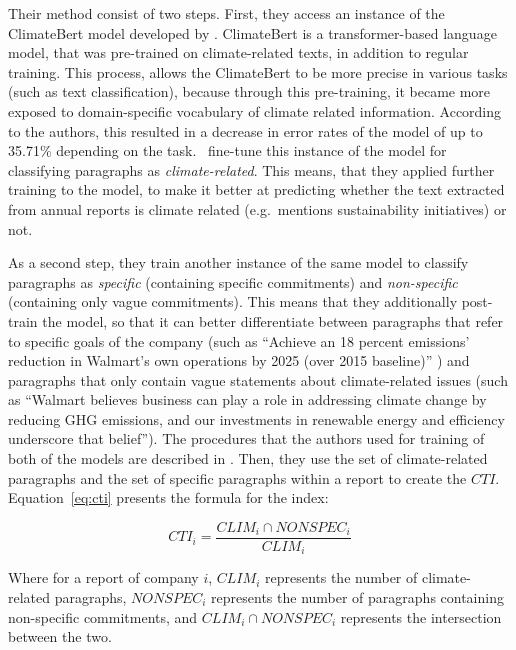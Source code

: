 \documentclass[12pt]{article}
\begin{document}
Their method consist of two steps. First, they access an instance of the ClimateBert model developed by \textcite{webersinkeCLIMATEBERTPretrainedLanguage2022}. ClimateBert is a transformer-based language model, that was pre-trained on climate-related texts, in addition to regular training. This process, allows the ClimateBert to be more precise in various tasks (such as text classification), because through this pre-training, it became more exposed to domain-specific vocabulary of climate related information. According to the authors, this resulted in a decrease in error rates of the model of up to 35.71\% depending on the task.~\citeauthor{binglerHowCheapTalk2024} fine-tune this instance of the model for classifying paragraphs as \textit{climate-related}. This means, that they applied further training to the model, to make it better at predicting whether the text extracted from annual reports is climate related (e.g.~mentions sustainability initiatives) or not. 

As a second step, they train another instance of the same model to classify paragraphs as \textit{specific} (containing specific commitments) and \textit{non-specific} (containing only vague commitments). This means that they additionally post-train the model, so that it can better differentiate between paragraphs that refer to specific goals of the company (such as ``Achieve an 18 percent emissions' reduction in Walmart's own operations by 2025 (over 2015 baseline)'' \parencite{walmart2018csr}) and paragraphs that only contain vague statements about climate-related issues (such as ``Walmart believes business can play a role in addressing climate change by reducing GHG emissions, and our investments in renewable energy and efficiency underscore that belief''). The procedures that the authors used for training of both of the models are described in \textcite{binglerCheapTalkCherrypicking2022,binglerHowCheapTalk2024}. Then, they use the set of climate-related paragraphs and the set of specific paragraphs within a report to create the $CTI$. Equation~\ref{eq:cti} presents the formula for the index:

\begin{equation}\label{eq:cti}
    CTI_i = \frac{CLIM_i \cap NONSPEC_i}{CLIM_{i}}
\end{equation}

Where for a report of company $i$, $CLIM_i$ represents the number of climate-related paragraphs, $NONSPEC_i$ represents the number of paragraphs containing non-specific commitments, and $CLIM_i \cap NONSPEC_i$ represents the intersection between the two. 
\end{document}
